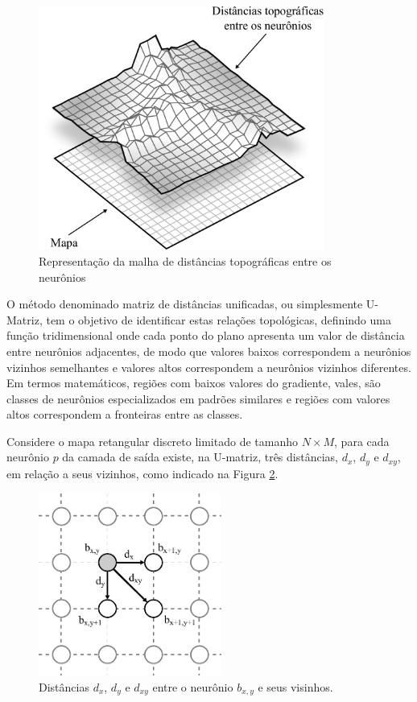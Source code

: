 \begin{figure}[H]
  \begin{center}
    \includegraphics[height=8cm]{imagens/mapa_x_umatriz.pdf}
  \end{center}
  \caption{ Representação da malha de distâncias topográficas entre os neurônios }
  \label{fig:mapa_x_umatriz}
\end{figure}

O método denominado matriz de distâncias unificadas, ou simplesmente U-Matriz,
tem o objetivo de identificar estas relações topológicas, definindo uma função
tridimensional onde cada ponto do plano apresenta um valor de distância entre
neurônios adjacentes, de modo que valores baixos correspondem a neurônios
vizinhos semelhantes e valores altos correspondem a neurônios vizinhos
diferentes. Em termos matemáticos, regiões com baixos valores do gradiente,
vales, são classes de neurônios especializados em padrões similares e regiões
com valores altos correspondem a fronteiras entre as classes.

Considere o mapa retangular discreto limitado de tamanho $ N \times M $, para cada
neurônio $ p $ da camada de saída existe, na U-matriz, três distâncias, $ d_x $,
$ d_y $ e  $ d_{xy} $, em relação a seus vizinhos, como indicado na Figura \ref{fig:dxdydxy}.

\begin{figure}[H]
  \begin{center}
    \includegraphics[height=6cm]{imagens/dxdydxy.pdf}
  \end{center}
  \caption{ Distâncias $ d_x $, $ d_y $ e $ d_{xy} $ entre o neurônio $ b_{x,y} $
    e seus visinhos. }
  \label{fig:dxdydxy}
\end{figure}

